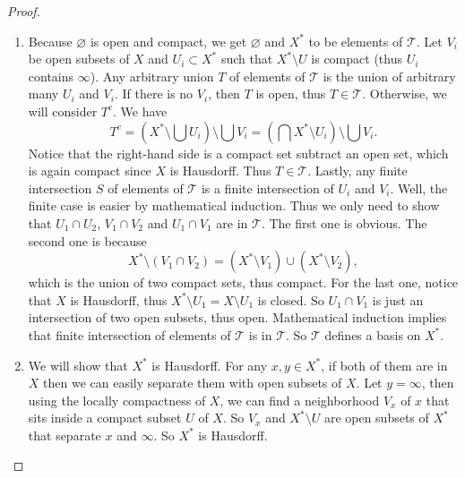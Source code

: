 \documentclass[12pt, a4paper]{article}
\theoremstyle{plain}
\newcommand{\T}{\mathcal{T}}
\begin{document}
    \begin{proof}
        \hfill
        \begin{enumerate}[label=(\alph*)]
            \item Because $\varnothing$ is open and compact, we get $\varnothing$ and $X^*$ to be elements of $\T$.
            Let $V_i$ be open subsets of $X$ and $U_i\subset X^*$ such that $X^*\setminus U$ is compact (thus $U_i$ contains $\infty$). Any arbitrary union $T$ of elements of $\T$ is the union of arbitrary many $U_i$ and $V_i$. If there is no $V_i$, then $T$ is open, thus $T\in \T$. Otherwise, we will consider $T^c$. We have
            \[
            T^c = \left(X^*\setminus\bigcup U_i\right)\setminus \bigcup V_i = \left(\bigcap X^*\setminus U_i \right)\setminus \bigcup V_i.
            \]
            Notice that the right-hand side is a compact set subtract an open set, which is again compact since $X$ is Hausdorff. Thus $T\in\T$. Lastly, any finite intersection $S$ of elements of $\T$ is a finite intersection of $U_i$ and $V_i$. Well, the finite case is easier by mathematical induction. Thus we only need to show that $U_1\cap U_2$, $V_1\cap V_2$ and $U_1\cap V_1$ are in $\T$. The first one is obvious. The second one is because
            \[
            X^*\setminus(V_1\cap V_2) = (X^*\setminus V_1)\cup (X^*\setminus V_2),
            \]
            which is the union of two compact sets, thus compact. For the last one, notice that $X$ is Hausdorff, thus $X^*\setminus U_1 = X\setminus U_1$ is closed. So $U_1\cap V_1$ is just an intersection of two open subsets, thus open. Mathematical induction implies that finite intersection of elements of $\T$ is in $\T$. So $\T$ defines a basis on $X^*$.

            \item We will show that $X^*$ is Hausdorff. For any $x,y\in X^*$, if both of them are in $X$ then we can easily separate them with open subsets of $X$. Let $y = \infty$, then using the locally compactness of $X$, we can find a neighborhood $V_x$ of $x$ that sits inside a compact subset $U$ of $X$. So $V_x$ and $X^*\setminus U$ are open subsets of $X^*$ that separate $x$ and $\infty$. So $X^*$ is Hausdorff.


\end{enumerate}
\end{proof}
\end{document}
